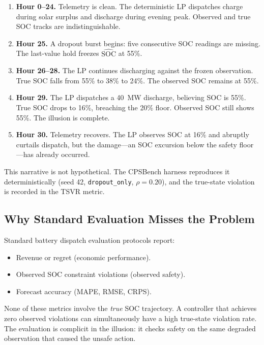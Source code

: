 \begin{enumerate}
  \item \textbf{Hour 0--24.}  Telemetry is clean.  The deterministic LP
    dispatches charge during solar surplus and discharge during evening
    peak.  Observed and true SOC tracks are indistinguishable.
  \item \textbf{Hour 25.}  A dropout burst begins: five consecutive SOC
    readings are missing.  The last-value hold freezes
    $\widehat{\mathrm{SOC}}$ at 55\%.
  \item \textbf{Hour 26--28.}  The LP continues discharging against the
    frozen observation.  True SOC falls from 55\% to 38\% to 24\%.  The
    observed SOC remains at 55\%.
  \item \textbf{Hour 29.}  The LP dispatches a 40~MW discharge, believing
    SOC is 55\%.  True SOC drops to 16\%, breaching the 20\% floor.
    Observed SOC still shows 55\%.  The illusion is complete.
  \item \textbf{Hour 30.}  Telemetry recovers.  The LP observes SOC at
    16\% and abruptly curtails dispatch, but the damage---an SOC
    excursion below the safety floor---has already occurred.
\end{enumerate}

This narrative is not hypothetical.  The CPSBench harness reproduces it
deterministically (seed 42, \texttt{dropout\_only}, $\rho = 0.20$), and
the true-state violation is recorded in the TSVR metric.

\subsection{Why Standard Evaluation Misses the Problem}
\label{sec:standard-eval-fails}

Standard battery dispatch evaluation protocols report:

\begin{itemize}
  \item Revenue or regret (economic performance).
  \item Observed SOC constraint violations (observed safety).
  \item Forecast accuracy (MAPE, RMSE, CRPS).
\end{itemize}

None of these metrics involve the \emph{true} SOC trajectory.  A
controller that achieves zero observed violations can simultaneously have
a high true-state violation rate.  The evaluation is complicit in the
illusion: it checks safety on the same degraded observation that caused
the unsafe action.


